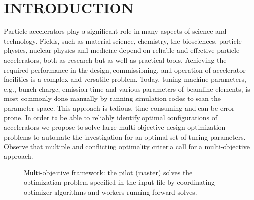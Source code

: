\documentclass[%
reprint,
amsmath,amssymb,
aps,
]{revtex4-1}
\begin{document}
\maketitle


\section{INTRODUCTION} \label{sec:introduction}

Particle accelerators play a significant role in many aspects of science and
  technology.
Fields, such as material science, chemistry, the biosciences, particle
  physics, nuclear physics and medicine depend on reliable and effective
  particle accelerators, both as research but as well as practical tools.
Achieving the required performance in the design, commissioning, and operation
  of accelerator facilities is a complex and versatile problem.
Today, tuning machine parameters, e.g., bunch charge, emission time and
  various parameters of beamline elements, is most commonly done manually by
  running simulation codes to scan the parameter space.
This approach is tedious, time consuming and can be error prone.
In order to be able to reliably identify optimal configurations of
  accelerators we propose to solve large multi-objective design optimization
  problems to automate the investigation for an optimal set of tuning
  parameters.
Observe that multiple and conflicting optimality criteria call for a
  multi-objective approach.

\begin{figure}%
	\scalebox{0.8}{
	\pgfdeclarelayer{background}
	\pgfsetlayers{background,main}
	\begin{tikzpicture}[text=black]%
	
	\end{tikzpicture}
}
\caption{Multi-objective framework: the pilot (master) solves the
	optimization problem specified in the input file by coordinating optimizer
	algorithms and workers running forward solves.}
\end{figure}\label{fig:framenetwork}
\end{document}

